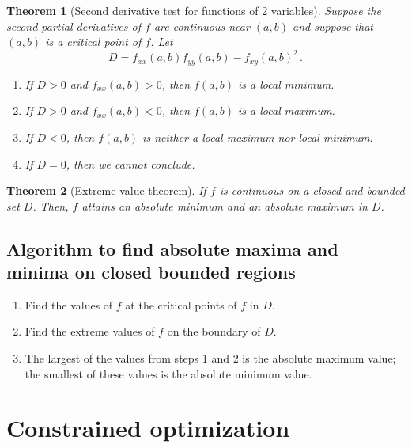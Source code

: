 \documentclass[
]{book}
\newtheorem{theorem}{Theorem}[chapter]
\theoremstyle{definition}
\theoremstyle{definition}
\theoremstyle{definition}
\theoremstyle{definition}
\theoremstyle{remark}
\begin{document}
\begin{theorem}[Second derivative test for functions of 2 variables]

Suppose the second partial derivatives of \(f\) are continuous near \((a,b)\)
and suppose that \((a,b)\) is a critical point of \(f\).
Let
\begin{equation*}
    D = f_{xx}(a,b) f_{yy}(a,b) - f_{xy}(a,b)^2\,.
\end{equation*}

\begin{enumerate}
\def\labelenumi{\arabic{enumi}.}
\item
  If \(D>0\) and \(f_{xx}(a,b) >0\), then \(f(a,b)\) is a local minimum.
\item
  If \(D>0\) and \(f_{xx}(a,b) <0\), then \(f(a,b)\) is a local maximum.
\item
  If \(D<0\), then \(f(a,b)\) is neither a local maximum nor local minimum.
\item
  If \(D=0\), then we cannot conclude.
\end{enumerate}

\end{theorem}

\begin{theorem}[Extreme value theorem]
If \(f\) is continuous on a \emph{closed} and \emph{bounded} set \(D\). Then,
\(f\) attains an absolute minimum and an absolute maximum in \(D\).
\end{theorem}

\subsection{Algorithm to find absolute maxima and minima on closed bounded regions}\label{algorithm-to-find-absolute-maxima-and-minima-on-closed-bounded-regions}

\begin{enumerate}
\def\labelenumi{\arabic{enumi}.}
\item
  Find the values of \(f\) at the critical points of \(f\) in \(D\).
\item
  Find the extreme values of \(f\) on the boundary of \(D\).
\item
  The largest of the values from steps 1 and 2 is the absolute maximum value;
  the smallest of these values is the absolute minimum value.
\end{enumerate}

\section{Constrained optimization}\label{constrained-optimization}
\end{document}
